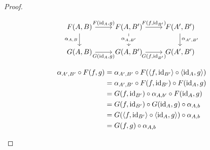 \begin{theorem}
\begin{proof}
\begin{description}
        \[\begin{tikzcd}[ampersand replacement=\&]
          {F(A, B)} \& {F(A, B')} \& {F(A', B')} \\
          {G(A, B)} \& {G(A,B')} \& {G(A',B')}
          \arrow["{F(\id_A, g)}", from=1-1, to=1-2]
          \arrow["{F(f, \id_{B'})}", from=1-2, to=1-3]
          \arrow["{\alpha_{A, B}}"', from=1-1, to=2-1]
          \arrow["{G(\id_A, g)}"', from=2-1, to=2-2]
          \arrow["{\alpha_{A, B'}}"{description}, from=1-2, to=2-2]
          \arrow["{G(f, \id_{B'})}"', from=2-2, to=2-3]
          \arrow["{\alpha_{A', B'}}", from=1-3, to=2-3]
        \end{tikzcd}\]

        \[
          \begin{aligned}
            \alpha_{A', B'} \circ F(f, g)
            &= \alpha_{A', B'} \circ F(\langle f, \mathrm{id}_{B'}\rangle \circ \langle\mathrm{id}_A, g\rangle)\\
            &= \alpha_{A', B'} \circ F(f, \mathrm{id}_{B'}) \circ F(\mathrm{id}_A, g)\\
            &= G(f, \mathrm{id}_{B'}) \circ \alpha_{A, b'} \circ F(\mathrm{id}_A, g)\\
            &= G(f, \mathrm{id}_{B'}) \circ G(\mathrm{id}_A, g) \circ \alpha_{A, b}\\
            &= G(\langle f, \mathrm{id}_{B'}\rangle \circ \langle \mathrm{id}_A,g \rangle) \circ \alpha_{A, b}\\
            &= G(f, g) \circ \alpha_{A, b}
          \end{aligned}
        \]
    \end{description}
  \end{proof}
  \vspace{-1.5\baselineskip}
\end{theorem}